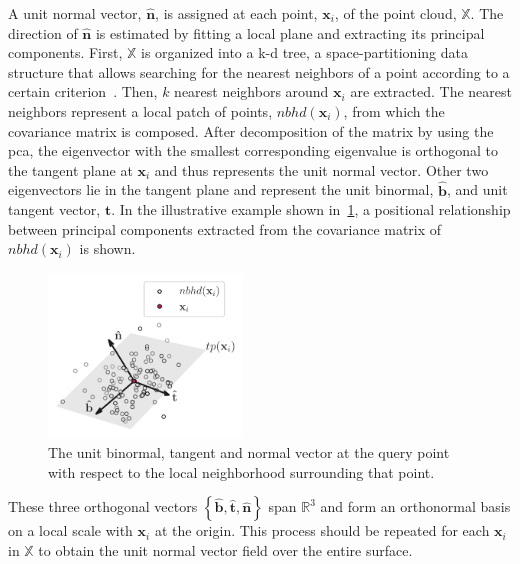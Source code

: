 A unit normal vector, $\mathbf{\hat n}$, is assigned at each point, $\mathbf{x}_i$, of the point cloud, $\mathbb{X}$.
The direction of $\mathbf{\hat n}$ is estimated by fitting a local plane and extracting its principal components.
First, $\mathbb{X}$ is organized into a \gls{k-d} tree, a space-partitioning data structure that allows searching for the nearest neighbors of a point according to a certain criterion~\cite{Bentley1975Multidimensional}.
Then, $k$ nearest neighbors around $\mathbf{x}_i$ are extracted.
The nearest neighbors represent a local patch of points, $nbhd(\mathbf{x}_i)$, from which the covariance matrix is composed.
After decomposition of the matrix by using the \gls{pca}, the eigenvector with the smallest corresponding eigenvalue is orthogonal to the tangent plane at $\mathbf{x}_i$ and thus represents the unit normal vector.
Other two eigenvectors lie in the tangent plane and represent the unit binormal, $\mathbf{\hat b}$, and unit tangent vector, $\mathbf{\hat t}$.
In the illustrative example shown in~\cref{fig:normal_estimation}, a positional relationship between principal components extracted from the covariance matrix of $nbhd(\mathbf{x}_i)$ is shown.
\begin{figure}[t]
    \centering
    \includegraphics[width=0.46\textwidth]{artwork/normal_estimation.pdf}
    \caption{The unit binormal, tangent and normal vector at the query point with respect to the local neighborhood surrounding that point.}
    \label{fig:normal_estimation}
\end{figure}
These three orthogonal vectors $\left\{ \mathbf{\hat b}, \mathbf{\hat t}, \mathbf{\hat n} \right\}$ span $\mathbb{R}^3$ and form an orthonormal basis on a local scale with $\mathbf{x}_i$ at the origin.
This process should be repeated for each $\mathbf{x}_i$ in $\mathbb{X}$ to obtain the unit normal vector field over the entire surface.

